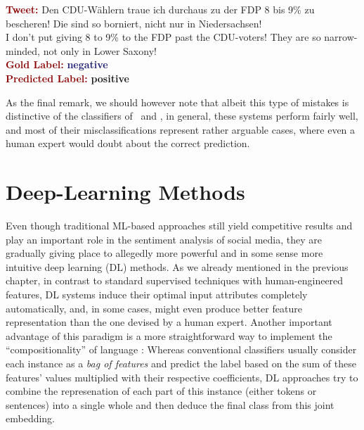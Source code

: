 \begin{example}\label{snt:cgsa:exmp:guenther-error}
  \noindent\textup{\bfseries\textcolor{darkred}{Tweet:}} {\upshape Den CDU-W\"ahlern traue ich durchaus zu der FDP 8 bis 9\% zu bescheren! Die sind so borniert, nicht nur in Niedersachsen!}\\
  \noindent I don't put giving 8 to 9\% to the FDP past the CDU-voters!  They are so narrow-minded, not only in Lower Saxony!\\[\exampleSep]
  \noindent\textup{\bfseries\textcolor{darkred}{Gold Label:}}\hspace*{4.3em}\textbf{%
    \upshape\textcolor{midnightblue}{negative}}\\
 \noindent\textup{\bfseries\textcolor{darkred}{Predicted Label:}}\hspace*{2em}\textbf{%
    \upshape\textcolor{green3}{positive}}
\end{example}

As the final remark, we should however note that albeit this type of
mistakes is distinctive of the classifiers of~\citet{Mohammad:13} and
\citet{Guenther:14}, in general, these systems perform fairly well,
and most of their misclassifications represent rather arguable cases,
where even a human expert would doubt about the correct prediction.

\section{Deep-Learning Methods}\label{sec:cgsa:dl-based}

Even though traditional ML-based approaches still yield competitive
results and play an important role in the sentiment analysis of social
media, they are gradually giving place to allegedly more powerful and
in some sense more intuitive deep learning (DL) methods.  As we
already mentioned in the previous chapter, in contrast to standard
supervised techniques with human-engineered features, DL systems
induce their optimal input attributes completely automatically, and,
in some cases, might even produce better feature representation than
the one devised by a human expert.  Another important advantage of
this paradigm is a more straightforward way to implement the
``compositionality'' of language \cite{Frege:1892}: Whereas
conventional classifiers usually consider each instance as a \emph{bag
  of features} and predict the label based on the sum of these
features' values multiplied with their respective coefficients, DL
approaches try to combine the represenation of each part of this
instance (either tokens or sentences) into a single whole and then
deduce the final class from this joint embedding.

